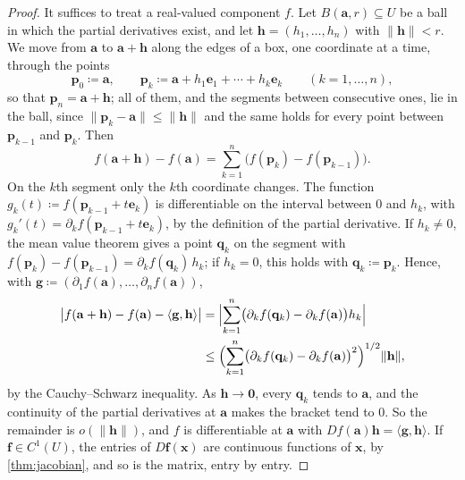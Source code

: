 \begin{proof}
It suffices to treat a real-valued component $f$. Let $B(\mathbf a,r)\subseteq U$ be a ball in which the partial derivatives exist, and let $\mathbf h=(h_1,\ldots,h_n)$ with $\|\mathbf h\|<r$. We move from $\mathbf a$ to $\mathbf a+\mathbf h$ along the edges of a box, one coordinate at a time, through the points
\[
\mathbf p_0\coloneqq\mathbf a,\qquad\mathbf p_k\coloneqq\mathbf a+h_1\mathbf e_1+\cdots+h_k\mathbf e_k\qquad(k=1,\ldots,n),
\]
so that $\mathbf p_n=\mathbf a+\mathbf h$; all of them, and the segments between consecutive ones, lie in the ball, since $\|\mathbf p_k-\mathbf a\|\le\|\mathbf h\|$ and the same holds for every point between $\mathbf p_{k-1}$ and $\mathbf p_k$. Then
\[
f(\mathbf a+\mathbf h)-f(\mathbf a)=\sum_{k=1}^n\bigl(f(\mathbf p_k)-f(\mathbf p_{k-1})\bigr).
\]
On the $k$th segment only the $k$th coordinate changes. The function $g_k(t)\coloneqq f(\mathbf p_{k-1}+t\mathbf e_k)$ is differentiable on the interval between $0$ and $h_k$, with $g_k'(t)=\partial_kf(\mathbf p_{k-1}+t\mathbf e_k)$, by the definition of the partial derivative. If $h_k\ne0$, the mean value theorem gives a point $\mathbf q_k$ on the segment with $f(\mathbf p_k)-f(\mathbf p_{k-1})=\partial_kf(\mathbf q_k)\,h_k$; if $h_k=0$, this holds with $\mathbf q_k\coloneqq\mathbf p_k$. Hence, with $\mathbf g\coloneqq(\partial_1f(\mathbf a),\ldots,\partial_nf(\mathbf a))$,
\[
\begin{aligned}
\bigl|f(\mathbf a+\mathbf h)-f(\mathbf a)-\langle\mathbf g,\mathbf h\rangle\bigr|&=\Bigl|\sum_{k=1}^n\bigl(\partial_kf(\mathbf q_k)-\partial_kf(\mathbf a)\bigr)h_k\Bigr|\\
&\le\Bigl(\sum_{k=1}^n\bigl(\partial_kf(\mathbf q_k)-\partial_kf(\mathbf a)\bigr)^2\Bigr)^{1/2}\|\mathbf h\|,
\end{aligned}
\]
by the Cauchy--Schwarz inequality. As $\mathbf h\to\mathbf0$, every $\mathbf q_k$ tends to $\mathbf a$, and the continuity of the partial derivatives at $\mathbf a$ makes the bracket tend to $0$. So the remainder is $o(\|\mathbf h\|)$, and $f$ is differentiable at $\mathbf a$ with $Df(\mathbf a)\mathbf h=\langle\mathbf g,\mathbf h\rangle$. If $\mathbf f\in C^1(U)$, the entries of $D\mathbf f(\mathbf x)$ are continuous functions of $\mathbf x$, by \cref{thm:jacobian}, and so is the matrix, entry by entry.
\end{proof}

